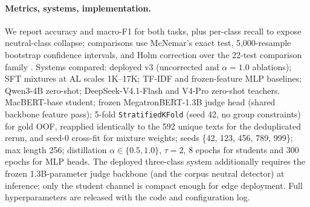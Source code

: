 \paragraph{Metrics, systems, implementation.} We report accuracy and
macro-F1 for both tasks, plus per-class recall to expose neutral-class
collapse; comparisons use McNemar's exact test, 5{,}000-resample
bootstrap confidence intervals, and Holm correction over the
22-test comparison family \citep{dror2018hitchhiker}. Systems compared:
deployed v3 (uncorrected and $\alpha{=}1.0$ ablations); SFT mixtures
at AL scales 1K--17K; TF-IDF and frozen-feature MLP baselines;
Qwen3-4B zero-shot; DeepSeek-V4.1-Flash and V4-Pro zero-shot teachers.
MacBERT-base student; frozen MegatronBERT-1.3B judge head (shared
backbone feature pass); 5-fold \texttt{StratifiedKFold} (seed 42, no
group constraints) for gold OOF, reapplied identically to the 592
unique texts for the deduplicated rerun, and seed-0 cross-fit for
mixture weights; seeds \{42, 123, 456, 789, 999\}; max length 256;
distillation $\alpha\in\{0.5,1.0\}$, $\tau{=}2$, 8 epochs for students
and 300 epochs for MLP heads. The deployed three-class system
additionally requires the frozen 1.3B-parameter judge backbone (and
the corpus neutral detector) at inference; only the student channel
is compact enough for edge deployment. Full hyperparameters are
released with the code and configuration log.
